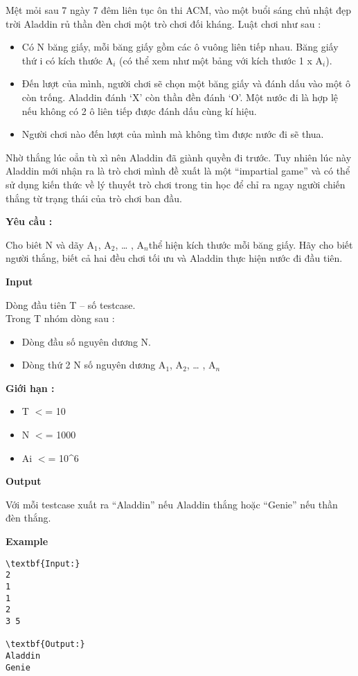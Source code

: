 

Mệt mỏi sau 7 ngày 7 đêm liên tục ôn thi ACM, vào một buổi sáng chủ nhật đẹp trời Aladdin rủ thần đèn chơi một trò chơi đối kháng. Luật chơi như sau :
\begin{itemize}
	\item Có N băng giấy, mỗi băng giấy gồm các ô vuông liên tiếp nhau. Băng giấy thứ i có kích thước A$_i$ (có thể xem như một bảng với kích thước 1 x A$_i$).
	\item Đến lượt của mình, người chơi sẽ chọn một băng giấy và đánh dấu vào một ô còn trống. Aladdin đánh ‘X’ còn thần đền đánh ‘O’. Một nước đi là hợp lệ nếu không có 2 ô liên tiếp được đánh dấu cùng kí hiệu.
	\item Người chơi nào đến lượt của mình mà không tìm được nước đi sẽ thua.
\end{itemize}

Nhờ thắng lúc oẳn tù xì nên Aladdin đã giành quyền đi trước. Tuy nhiên lúc này Aladdin mới nhận ra là trò chơi mình đề xuất là một “impartial game” và có thể sử dụng kiến thức về lý thuyết trò chơi trong tin học để chỉ ra ngay người chiến thắng từ trạng thái của trò chơi ban đầu.

\textbf{Yêu cầu :}

Cho biêt N và dãy A$_1$, A$_2$, … , A$_n $thể hiện kích thước mỗi băng giấy. Hãy cho biết người thắng, biết cả hai đều chơi tối ưu và Aladdin thực hiện nước đi đầu tiên.

\textbf{Input}

Dòng đầu tiên T – số testcase.
\\Trong T nhóm dòng sau :
\begin{itemize}
	\item Dòng đầu số nguyên dương N.
	\item Dòng thứ 2 N số nguyên dương A$_1$, A$_2$, … , A$_n$
\end{itemize}

\textbf{Giới hạn : }
\begin{itemize}
	\item T $<$= 10
	\item N $<$= 1000
	\item Ai $<$= 10\textasciicircum6
\end{itemize}

\textbf{Output}

Với mỗi testcase xuất ra “Aladdin” nếu Aladdin thắng hoặc “Genie” nếu thần đèn thắng.

\textbf{Example}
\begin{verbatim}
\textbf{Input:}
2
1
1
2
3 5

\textbf{Output:}
Aladdin
Genie\end{verbatim}
